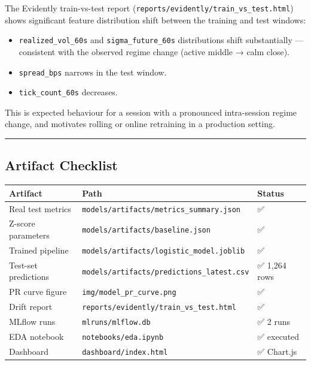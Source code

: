 \documentclass[
]{article}
\providecommand{\tightlist}{%
  \setlength{\itemsep}{0pt}\setlength{\parskip}{0pt}}
\begin{document}
The Evidently train-vs-test report
(\texttt{reports/evidently/train\_vs\_test.html}) shows significant
feature distribution shift between the training and test windows:

\begin{itemize}
\tightlist
\item
  \texttt{realized\_vol\_60s} and \texttt{sigma\_future\_60s}
  distributions shift substantially --- consistent with the observed
  regime change (active middle → calm close).
\item
  \texttt{spread\_bps} narrows in the test window.
\item
  \texttt{tick\_count\_60s} decreases.
\end{itemize}

This is expected behaviour for a session with a pronounced intra-session
regime change, and motivates rolling or online retraining in a
production setting.

\begin{center}\rule{0.5\linewidth}{0.5pt}\end{center}

\hypertarget{artifact-checklist}{%
\subsection{Artifact Checklist}\label{artifact-checklist}}

\begin{longtable}[]{@{}lll@{}}
\toprule
Artifact & Path & Status \\
\midrule
\endhead
Real test metrics & \texttt{models/artifacts/metrics\_summary.json} &
✅ \\
Z-score parameters & \texttt{models/artifacts/baseline.json} & ✅ \\
Trained pipeline & \texttt{models/artifacts/logistic\_model.joblib} &
✅ \\
Test-set predictions & \texttt{models/artifacts/predictions\_latest.csv}
& ✅ 1,264 rows \\
PR curve figure & \texttt{img/model\_pr\_curve.png} & ✅ \\
Drift report & \texttt{reports/evidently/train\_vs\_test.html} & ✅ \\
MLflow runs & \texttt{mlruns/mlflow.db} & ✅ 2 runs \\
EDA notebook & \texttt{notebooks/eda.ipynb} & ✅ executed \\
Dashboard & \texttt{dashboard/index.html} & ✅ Chart.js \\
\bottomrule
\end{longtable}
\end{document}
